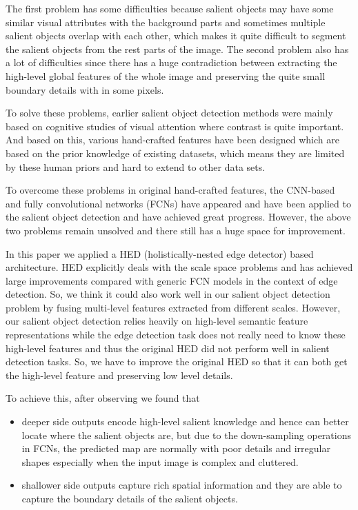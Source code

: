 \documentclass[10pt,journal, compsoc]{IEEEtran}
\begin{document}
The first problem has some difficulties because salient objects may have some similar visual attributes with the background parts and sometimes multiple salient objects overlap with each other, which makes it quite difficult to segment the salient objects from the rest parts of the image. The second problem also has a lot of difficulties since there has a huge contradiction between extracting the high-level global features of the whole image and preserving the quite small boundary details with in some pixels.

To solve these problems, earlier salient object detection methods were mainly based on cognitive studies of visual attention where contrast is quite important. And based on this, various hand-crafted features have been designed which are based on the prior knowledge of existing datasets, which means they are limited by these human priors and hard to extend to other data sets.

To overcome these problems in original hand-crafted features, the CNN-based and fully convolutional networks (FCNs) have appeared and have been applied to the salient object detection and have achieved great progress. However, the above two problems remain unsolved and there still has a huge space for improvement.

In this paper we applied a HED (holistically-nested edge detector) based architecture. HED explicitly deals with the scale space problems and has achieved large improvements compared with generic FCN models\cite{wang2018salient} in the context of edge detection. So, we think it could also work well in our salient object detection problem by fusing multi-level features extracted from different scales. However, our salient object detection relies heavily on high-level semantic feature representations while the edge detection task does not really need to know these high-level features and thus the original HED did not perform well in salient detection tasks. So, we have to improve the original HED so that it can both get the high-level feature and preserving low level details.

To achieve this, after observing we found that 
\begin{itemize}
	\item deeper side outputs encode high-level salient knowledge and hence can better locate where the salient objects are, but due to the down-sampling operations in FCNs, the predicted map are normally with poor details and irregular shapes especially when the input image is complex and cluttered.
	\item shallower side outputs capture rich spatial information and they are able to capture the boundary details of the salient objects.
\end{itemize}
\end{document}
